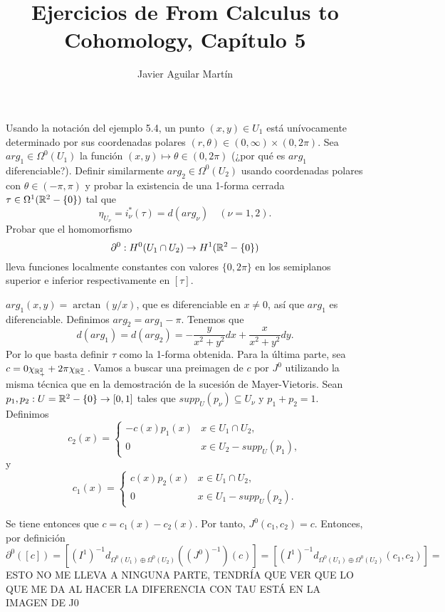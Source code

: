 \documentclass[twoside]{article}
\begin{document}
\title{Ejercicios de From Calculus to Cohomology, Capítulo 5}
\author{Javier Aguilar Martín}
\maketitle


\begin{ejercicio}{5.1}
Usando la notación del ejemplo 5.4, un punto $(x,y)\in U_1$ está unívocamente determinado por sus coordenadas polares $(r,\theta)\in (0,\infty)\times (0,2\pi)$. Sea $arg_1\in\Omega^0(U_1)$ la función $(x,y)\mapsto \theta\in(0,2\pi)$ (¿por qué es $arg_1$ diferenciable?). Definir similarmente $arg_2\in\Omega^0(U_2)$ usando coordenadas polares con $\theta\in (-\pi,\pi)$ y probar la existencia de una 1-forma cerrada $\tau\in\Omega^1(\mathbb{R}^2-\{0\})$ tal que
\[
\eta_{U_{\nu}}=i^*_{\nu}(\tau)=d(arg_{\nu})\quad (\nu=1,2).
\]
Probar que el homomorfismo 
\[
\partial^0:H^0(U_1\cap U_2)\to H^1(\mathbb{R}^2-\{0\})
\]
lleva funciones localmente constantes con valores $\{0,2\pi\}$ en los semiplanos superior e inferior respectivamente en $[\tau]$. 
\end{ejercicio}
\begin{solucion}
$arg_1(x,y)=\arctan(y/x)$, que es diferenciable en $x\neq 0$, así que $arg_1$ es diferenciable. Definimos $arg_2=arg_1-\pi$. Tenemos que 
\[
d(arg_1)=d(arg_2)=-\frac{y}{x^2+y^2}dx+\frac{x}{x^2+y^2}dy.
\]
Por lo que basta definir $\tau$ como la 1-forma obtenida. Para la última parte, sea $c=0\chi_{\mathbb{R}^2_+}+2\pi\chi_{\mathbb{R}^2_-}$. Vamos a buscar una preimagen de $c$ por $J^0$ utilizando la misma técnica que en la demostración de la sucesión de Mayer-Vietoris. Sean $p_1,p_2:U=\mathbb{R}^2-\{0\}\to[0,1]$ tales que $supp_U(p_{\nu})\subseteq U_{\nu}$ y $p_1+p_2=1$. Definimos
\[
c_2(x)=\begin{cases}
-c(x)p_1(x) & x\in U_1\cap U_2,\\
0 & x\in U_2-supp_U(p_1),
\end{cases}
\]
y 
\[
c_1(x)=\begin{cases}
c(x)p_2(x) & x\in U_1\cap U_2,\\
0 & x\in U_1-supp_U(p_2).
\end{cases}
\]

Se tiene entonces que $c=c_1(x)-c_2(x)$. Por tanto, $J^0(c_1,c_2)=c$. 
 Entonces, por definición
\[
\partial^0([c])=[(I^1)^{-1}d_{\Omega^0(U_1)\oplus\Omega^0(U_2)}((J^0)^{-1})(c)]=[(I^1)^{-1}d_{\Omega^0(U_1)\oplus\Omega^0(U_2)}(c_1,c_2)]=
\]
ESTO NO ME LLEVA A NINGUNA PARTE, TENDRÍA QUE VER QUE LO QUE ME DA AL HACER LA DIFERENCIA CON TAU ESTÁ EN LA IMAGEN DE J0
\end{solucion}
\end{document}
